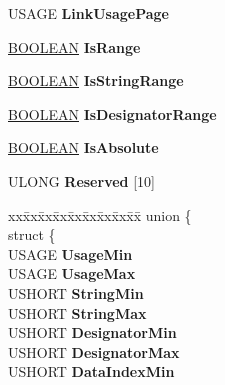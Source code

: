 \begin{DoxyCompactItemize}
U\+S\+A\+GE {\bfseries Link\+Usage\+Page}
\item 
\mbox{\label{struct___h_i_d_p___b_u_t_t_o_n___c_a_p_s_a54c6fe959574483fa1786f7bb2fb07ed}} 
\hyperlink{_processor_bind_8h_a112e3146cb38b6ee95e64d85842e380a}{B\+O\+O\+L\+E\+AN} {\bfseries Is\+Range}
\item 
\mbox{\label{struct___h_i_d_p___b_u_t_t_o_n___c_a_p_s_aa45d0adfe6beb255fce1549edb7af797}} 
\hyperlink{_processor_bind_8h_a112e3146cb38b6ee95e64d85842e380a}{B\+O\+O\+L\+E\+AN} {\bfseries Is\+String\+Range}
\item 
\mbox{\label{struct___h_i_d_p___b_u_t_t_o_n___c_a_p_s_afbc063eda9be56e02dbf1ade0fed0a5e}} 
\hyperlink{_processor_bind_8h_a112e3146cb38b6ee95e64d85842e380a}{B\+O\+O\+L\+E\+AN} {\bfseries Is\+Designator\+Range}
\item 
\mbox{\label{struct___h_i_d_p___b_u_t_t_o_n___c_a_p_s_a1cf3d52dcd407fef9789150852700cf1}} 
\hyperlink{_processor_bind_8h_a112e3146cb38b6ee95e64d85842e380a}{B\+O\+O\+L\+E\+AN} {\bfseries Is\+Absolute}
\item 
\mbox{\label{struct___h_i_d_p___b_u_t_t_o_n___c_a_p_s_a11f96d332d67aa795bec707d5a96b8e4}} 
U\+L\+O\+NG {\bfseries Reserved} \mbox{[}10\mbox{]}
\item 
\mbox{\label{struct___h_i_d_p___b_u_t_t_o_n___c_a_p_s_a9bdf0c5c4b513ee7e2650debfc3b0b04}} 
\begin{tabbing}
xx\=xx\=xx\=xx\=xx\=xx\=xx\=xx\=xx\=\kill
union \{\\
\>struct \{\\
\>\>USAGE {\bfseries UsageMin}\\
\>\>USAGE {\bfseries UsageMax}\\
\>\>USHORT {\bfseries StringMin}\\
\>\>USHORT {\bfseries StringMax}\\
\>\>USHORT {\bfseries DesignatorMin}\\
\>\>USHORT {\bfseries DesignatorMax}\\
\>\>USHORT {\bfseries DataIndexMin}\\

\end{tabbing}
\end{DoxyCompactItemize}
